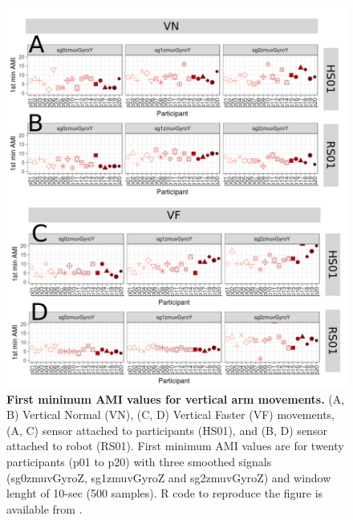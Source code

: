 \begin{figure}[!h]
\centering
\includegraphics[width=1.0\textwidth]{ami_aVw10}
	\caption{
	{\bf First minimum AMI values for vertical arm movements.}
		(A, B) Vertical Normal (VN), (C, D) Vertical Faster (VF) 
		movements,
		(A, C) sensor attached to participants (HS01), and
		(B, D) sensor attached to robot (RS01).
		First minimum AMI values are for twenty participants 
		(p01 to p20) with three smoothed signals (sg0zmuvGyroZ, 
		sg1zmuvGyroZ and sg2zmuvGyroZ) and  window lenght of 
		10-sec (500 samples).
		R code to reproduce the figure is available 
		from \cite{hwum2018}.
        }
    \label{fig:amiV}
\end{figure}



